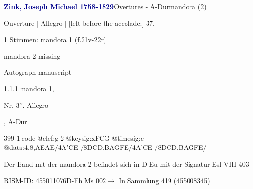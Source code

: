 \documentclass[twocolumn, 12pt]{book}
\begin{document}
\par \vspace{16pt} \textcolor{darkblue}{\textbf{Zink, Joseph Michael  1758-1829}}\hfillplus{\textbf{[399]}}\newline Overtures - A-Dur\newline mandora (2)
\par \begin{itshape}[f.21v, at left:] Ouverture | Allegro | [left before the accolade:] 37.\end{itshape} 
\par \textcolor{darkblue}{}  1 Stimmen: mandora 1  (f.21v-22r)\newline \begin{small} mandora 2 missing\end{small} \newline Autograph manuscript
\par 1.1.1  mandora 1, \begin{itshape}Nr. 37. Allegro\end{itshape}, A-Dur  
\begin{filecontents*}{399-1.code}
@clef:g-2
@keysig:xFCG
@timesig:c
@data:4.8,AEAE/4A'CE-/{8DC}{D,B}{AG}{FE}/4A'CE-/{8DC}{D,B}{AG}{FE}/
\end{filecontents*}
\newline %
\par Der Band mit der mandora 2 befindet sich in D Eu mit der Signatur Esl VIII 403
\par RISM-ID: 455011076\newline D-Fh  Ms 002\newline $\rightarrow$ In Sammlung 419 (455008345)
      
\end{document}
